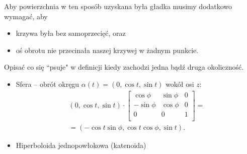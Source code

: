 \begin{frame}[<+->]


\begin{uwaga}
Aby powierzchnia w ten sposób uzyskana była gładka musimy dodatkowo wymagać, aby 
\begin{itemize}
\item krzywa była bez samoprzecięć, oraz
\item oś obrotu nie przecinała naszej krzywej w żadnym punkcie.
\end{itemize}
\end{uwaga}


\begin{exercise}
Opisać co się ``psuje" w definicji kiedy zachodzi jedna bądź druga okoliczność.
\end{exercise}

\end{frame}
\begin{frame}[<+->]

\begin{przyklad}
\begin{itemize}
\item Sfera -- obr\'ot okręgu $\alpha(t)=(0,\cos t,\sin t)$ wok\'oł osi $z$:
\begin{multline*}
(0,		\cos t,		\sin t)\cdot
\left[\begin{array}{ccc}
\cos\phi 	& \sin\phi 	& 0 \\
-\sin\phi 	& \cos\phi 	& 0\\
0 		& 0 		& 1\\
\end{array}\right]=
\\=(-\cos t\sin\phi, \cos t\cos\phi,\sin t).
\end{multline*}

\item Hiperboloida jednopowłokowa (katenoida)

\end{itemize}
\end{przyklad}
\end{frame}

